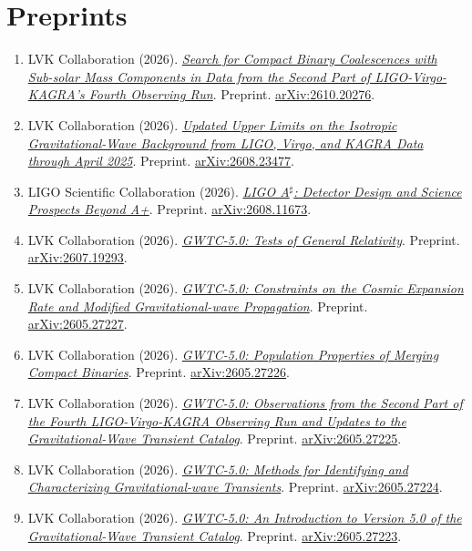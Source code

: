 \documentclass[11pt]{article}
\begin{document}
\section*{Preprints}
\begin{enumerate}[start=49]
\item LVK Collaboration (2026). \href{https://arxiv.org/abs/2610.20276}{\textit{Search for Compact Binary Coalescences with Sub-solar Mass Components in Data from the Second Part of LIGO-Virgo-KAGRA's Fourth Observing Run}}. Preprint. \href{https://arxiv.org/abs/2610.20276}{arXiv:2610.20276}.
\item LVK Collaboration (2026). \href{https://arxiv.org/abs/2608.23477}{\textit{Updated Upper Limits on the Isotropic Gravitational-Wave Background from LIGO, Virgo, and KAGRA Data through April 2025}}. Preprint. \href{https://arxiv.org/abs/2608.23477}{arXiv:2608.23477}.
\item LIGO Scientific Collaboration (2026). \href{https://arxiv.org/abs/2608.11673}{\textit{LIGO A$^\sharp$: Detector Design and Science Prospects Beyond A+}}. Preprint. \href{https://arxiv.org/abs/2608.11673}{arXiv:2608.11673}.
\item LVK Collaboration (2026). \href{https://arxiv.org/abs/2607.19293}{\textit{GWTC-5.0: Tests of General Relativity}}. Preprint. \href{https://arxiv.org/abs/2607.19293}{arXiv:2607.19293}.
\item LVK Collaboration (2026). \href{https://arxiv.org/abs/2605.27227}{\textit{GWTC-5.0: Constraints on the Cosmic Expansion Rate and Modified Gravitational-wave Propagation}}. Preprint. \href{https://arxiv.org/abs/2605.27227}{arXiv:2605.27227}.
\item LVK Collaboration (2026). \href{https://arxiv.org/abs/2605.27226}{\textit{GWTC-5.0: Population Properties of Merging Compact Binaries}}. Preprint. \href{https://arxiv.org/abs/2605.27226}{arXiv:2605.27226}.
\item LVK Collaboration (2026). \href{https://arxiv.org/abs/2605.27225}{\textit{GWTC-5.0: Observations from the Second Part of the Fourth LIGO-Virgo-KAGRA Observing Run and Updates to the Gravitational-Wave Transient Catalog}}. Preprint. \href{https://arxiv.org/abs/2605.27225}{arXiv:2605.27225}.
\item LVK Collaboration (2026). \href{https://arxiv.org/abs/2605.27224}{\textit{GWTC-5.0: Methods for Identifying and Characterizing Gravitational-wave Transients}}. Preprint. \href{https://arxiv.org/abs/2605.27224}{arXiv:2605.27224}.
\item LVK Collaboration (2026). \href{https://arxiv.org/abs/2605.27223}{\textit{GWTC-5.0: An Introduction to Version 5.0 of the Gravitational-Wave Transient Catalog}}. Preprint. \href{https://arxiv.org/abs/2605.27223}{arXiv:2605.27223}.

\end{enumerate}
\end{document}
